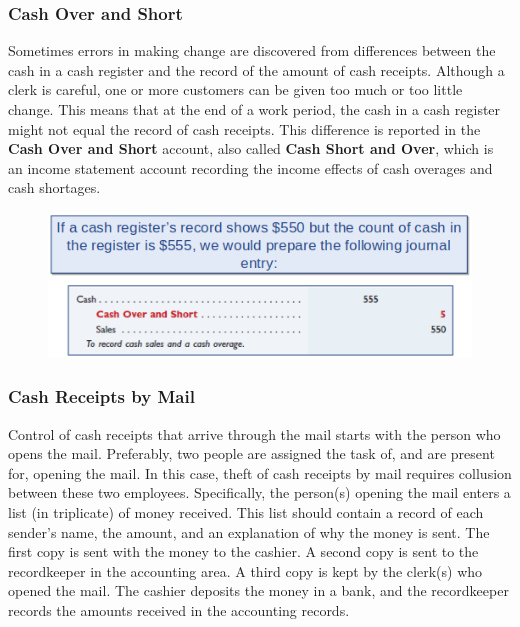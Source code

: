 \documentclass[../main.tex]{subfiles}
\begin{document}
	\subsubsection{Cash Over and Short}
	
	Sometimes errors in making change are discovered from differences between 
	the cash in a cash register and the record of the amount of cash receipts. 
	Although a clerk is careful, one or more customers can be given too much or 
	too little change. This means that at the end of a work period, the cash in 
	a cash register might not equal the record of cash receipts. This 
	difference is reported in the \textbf{Cash Over and Short} account, also 
	called \textbf{Cash Short and Over}, which is an income statement account 
	recording the income effects of cash overages and cash shortages.
	
	\begin{figure}[ht]
		\centering
		\includegraphics[width=1\columnwidth]{images/c5/cash_over_and_short.png}
	\end{figure}
	
	\subsubsection{Cash Receipts by Mail}
	
	Control of cash receipts that arrive through the mail starts with the 
	person who opens the mail. Preferably, two people are assigned the task of, 
	and are present for, opening the mail. In this case, theft of cash receipts 
	by mail requires collusion between these two employees. Specifically, the 
	person(s) opening the mail enters a list (in triplicate) of money received. 
	This list should contain a record of each sender’s name, the amount, and an 
	explanation of why the money is sent. The first copy is sent with the money 
	to the cashier. A second copy is sent to the recordkeeper in the accounting 
	area. A third copy is kept by the clerk(s) who opened the mail. The cashier 
	deposits the money in a bank, and the recordkeeper records the amounts 
	received in the accounting records. 
	
\end{document}
